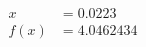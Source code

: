 \documentclass[preview]{standalone}
\begin{document}
\begin{align*}
x &= 0.0223\\f(x) &= 4.0462434
\end{align*}
\end{document}
